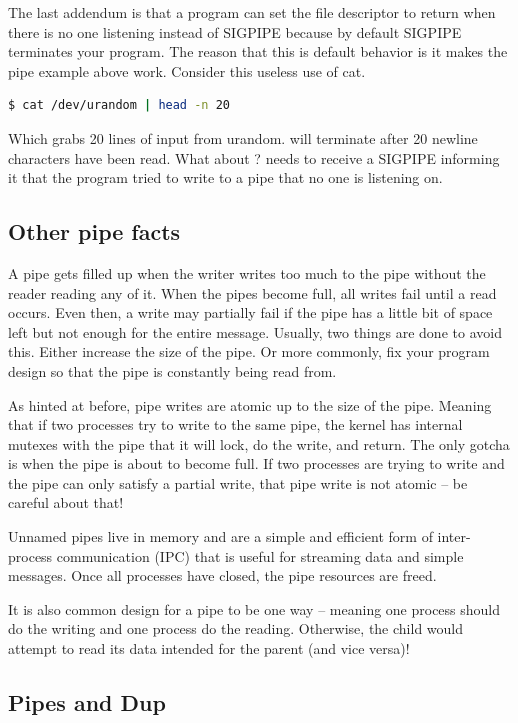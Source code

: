 The last addendum is that a program can set the file descriptor to return when there is no one listening instead of SIGPIPE because by default SIGPIPE terminates your program.
The reason that this is default behavior is it makes the pipe example above work.
Consider this useless use of cat.
	 
\begin{lstlisting}[language=bash]
	$ cat /dev/urandom | head -n 20
\end{lstlisting}
Which grabs 20 lines of input from urandom.  will terminate after 20 newline characters have been read.
What about ?
 needs to receive a SIGPIPE informing it that the program tried to write to a pipe that no one is listening on.
	 
\subsection{Other pipe facts}
	 
A pipe gets filled up when the writer writes too much to the pipe without the reader reading any of it. When the pipes become full, all writes fail until a read occurs. Even then, a write may partially fail if the pipe has a little bit of space left but not enough for the entire message. Usually, two things are done to avoid this. Either increase the size of the pipe. Or more commonly, fix your program design so that the pipe is constantly being read from.
	 
As hinted at before, pipe writes are atomic up to the size of the pipe. Meaning that if two processes try to write to the same pipe, the kernel has internal mutexes with the pipe that it will lock, do the write, and return. The only gotcha is when the pipe is about to become full. If two processes are trying to write and the pipe can only satisfy a partial write, that pipe write is not atomic -- be careful about that!
	 
Unnamed pipes live in memory and are a simple and efficient form of inter-process communication (IPC) that is useful for streaming data and simple messages. Once all processes have closed, the pipe resources are freed.
	 
It is also common design for a pipe to be one way -- meaning one process should do the writing and one process do the reading. Otherwise, the child would attempt to read its data intended for the parent (and vice versa)!
	 
\subsection{Pipes and Dup}
	 

